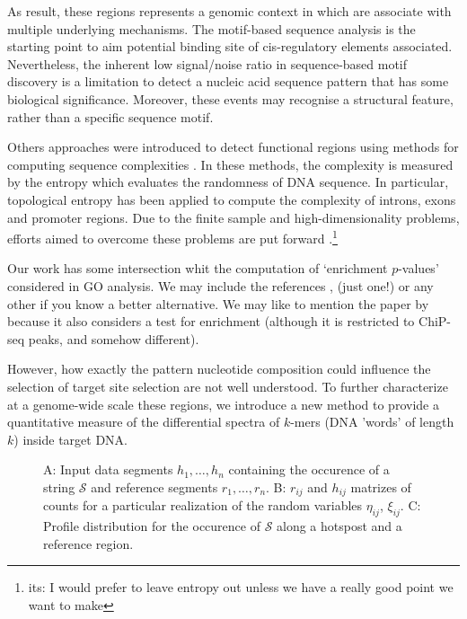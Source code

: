 \documentclass{bioinfo}
\begin{document}
As result, these regions represents a genomic context in which are associate with multiple underlying mechanisms. The motif-based sequence analysis is the starting point to aim potential binding site of cis-regulatory elements associated. Nevertheless, the inherent low signal/noise ratio in sequence-based motif discovery is a limitation to detect a nucleic acid sequence pattern that has some biological significance. Moreover, these events may recognise a structural feature, rather than a specific sequence motif.

Others approaches were introduced to detect functional regions using methods for computing sequence complexities \cite{pmid24533097,pmid21317142}. In these methods, the complexity is measured by the entropy which evaluates the randomness of DNA sequence. In particular, topological entropy has been applied to compute the complexity of introns, exons and promoter regions. Due to the finite sample and high-dimensionality problems, efforts aimed to overcome these problems are put forward \cite{pmid21317142}.\footnote{its: I would prefer to leave entropy out unless we have a really good point we want to make}


Our work has some intersection whit the computation of `enrichment $p$-values' considered in  GO analysis. We may include the references \cite{HSL}, \cite{RPTP} (just one!) or any other if you know a better alternative. We may like to mention the paper by \cite{BM} because it also considers a test for enrichment (although it is restricted to ChiP-seq peaks, and somehow different).

However, how exactly the pattern nucleotide composition could influence the selection of target site selection are not well understood. To further characterize at a genome-wide scale these regions, we introduce a new method to provide a quantitative measure of the differential spectra of $k$-mers (DNA 'words' of length $k$) inside target DNA.

\begin{figure}
 
 \label{fig:methodscheme}
 \caption{A: Input data segments $h_1, \ldots, h_n$ containing the occurence of a string $\mathcal S$ and reference segments $r_1, \ldots, r_n$. B: $r_{ij}$ and $h_{ij}$ matrizes of counts for a particular realization of the random variables $\eta_{ij}$, $\xi_{ij}$. C: Profile distribution for the occurence of $\mathcal S$ along a hotspost and a reference region.}
\end{figure}
\end{document}
